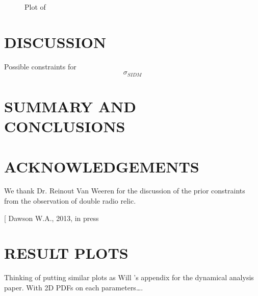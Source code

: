 \documentclass[useAMS,usenatbib]{mn2e}
\begin{document}
\begin{figure}
  \vspace*{174pt}
  \caption{Plot of }
\end{figure}

%
\begin{figure*}
\end{figure*}


\section{DISCUSSION}
Possible constraints for \[\sigma_{SIDM}\]
\section{SUMMARY AND CONCLUSIONS}


\section*{ACKNOWLEDGEMENTS}
We thank Dr. Reinout Van Weeren for the discussion of the prior constraints from 
the observation of double radio relic.

\begin{thebibliography}{99}
\bibitem[\protect{} Dawson W.A., 2013, in press
\end{thebibliography}

\appendix

\section{RESULT PLOTS}
Thinking of putting similar plots as Will 's appendix for the dynamical analysis paper.
With 2D PDFs on each parameters\ldots.





\bsp

\label{lastpage}
\end{document}
